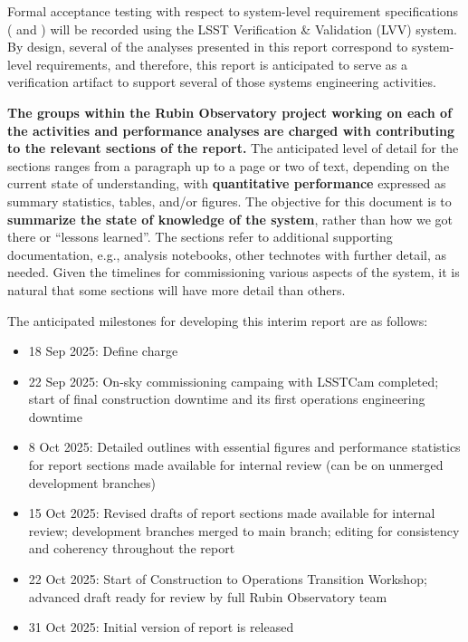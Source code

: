 Formal acceptance testing with respect to system-level requirement specifications ( and ) will be recorded using the LSST Verification \& Validation (LVV) system.
By design, several of the analyses presented in this report correspond to system-level requirements, and therefore, this report is anticipated to serve as a verification artifact to support several of those systems engineering activities.

\textbf{The groups within the Rubin Observatory project working on each of the activities and performance analyses are charged with contributing to the relevant sections of the report.}
The anticipated level of detail for the sections ranges from a paragraph up to a page or two of text, depending on the current state of understanding, with \textbf{quantitative performance} expressed as summary statistics, tables, and/or figures.
The objective for this document is to \textbf{summarize the state of knowledge of the system}, rather than how we got there or ``lessons learned''.
The sections refer to additional supporting documentation, e.g., analysis notebooks, other technotes with further detail, as needed.
Given the timelines for commissioning various aspects of the system, it is natural that some sections will have more detail than others.

The anticipated milestones for developing this interim report are as follows:

\begin{itemize}

    \item 18 Sep 2025: Define charge

    \item 22 Sep 2025: On-sky commissioning campaing with LSSTCam completed; start of final construction downtime and its first operations engineering downtime

    \item 8 Oct 2025: Detailed outlines with essential figures and performance statistics for report sections made available for internal review (can be on unmerged development branches)

    \item 15 Oct 2025: Revised drafts of report sections made available for internal review; development branches merged to main branch; editing for consistency and coherency throughout the report

    \item 22 Oct 2025: Start of Construction to Operations Transition Workshop; advanced draft ready for review by full Rubin Observatory team

    \item 31 Oct 2025: Initial version of report is released

\end{itemize}